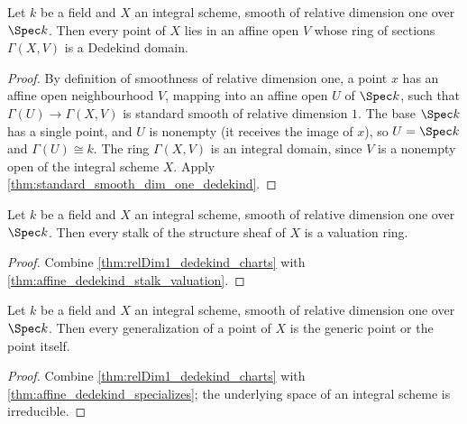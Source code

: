 \begin{theorem}
  \label{thm:relDim1_dedekind_charts}
  \leanok
  Let \(k\) be a field and \(X\) an integral scheme, smooth of relative dimension one over
  \(\Spec k\). Then every point of \(X\) lies in an affine open \(V\) whose ring of
  sections \(\Gamma(X, V)\) is a Dedekind domain.
\end{theorem}
\begin{proof}
  \leanok
  By definition of smoothness of relative dimension one, a point \(x\) has an affine open
  neighbourhood \(V\), mapping into an affine open \(U\) of \(\Spec k\), such that
  \(\Gamma(U) \to \Gamma(X, V)\) is standard smooth of relative dimension \(1\). The base
  \(\Spec k\) has a single point, and \(U\) is nonempty (it receives the image of \(x\)),
  so \(U = \Spec k\) and \(\Gamma(U) \cong k\). The ring \(\Gamma(X, V)\) is an integral
  domain, since \(V\) is a nonempty open of the integral scheme \(X\). Apply
  \ref{thm:standard_smooth_dim_one_dedekind}.
\end{proof}

\begin{theorem}
  \label{thm:relDim1_stalks_valuation}
  \leanok
  Let \(k\) be a field and \(X\) an integral scheme, smooth of relative dimension one over
  \(\Spec k\). Then every stalk of the structure sheaf of \(X\) is a valuation ring.
\end{theorem}
\begin{proof}
  \leanok
  Combine \ref{thm:relDim1_dedekind_charts} with
  \ref{thm:affine_dedekind_stalk_valuation}.
\end{proof}

\begin{theorem}
  \label{thm:relDim1_specializes}
  \leanok
  Let \(k\) be a field and \(X\) an integral scheme, smooth of relative dimension one over
  \(\Spec k\). Then every generalization of a point of \(X\) is the generic point or the
  point itself.
\end{theorem}
\begin{proof}
  \leanok
  Combine \ref{thm:relDim1_dedekind_charts} with \ref{thm:affine_dedekind_specializes};
  the underlying space of an integral scheme is irreducible.
\end{proof}

